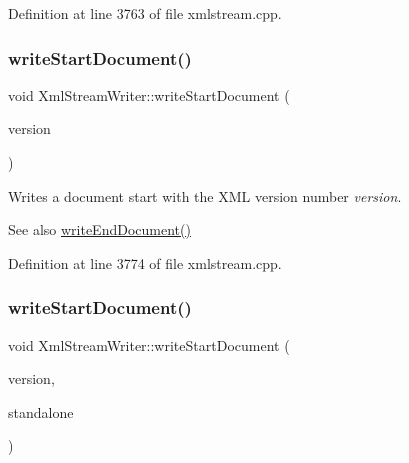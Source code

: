 Definition at line 3763 of file xmlstream.\+cpp.

\mbox{\label{class_xml_stream_writer_affda139fb2d91c8893615b6ca6b9570a}} 
\subsubsection{\texorpdfstring{write\+Start\+Document()}{writeStartDocument()}\hspace{0.1cm}{\footnotesize\ttfamily [2/3]}}
{\footnotesize\ttfamily void Xml\+Stream\+Writer\+::write\+Start\+Document (\begin{DoxyParamCaption}\item[{const Q\+String \&}]{version }\end{DoxyParamCaption})}

Writes a document start with the X\+ML version number {\itshape version}.

\begin{DoxySeeAlso}{See also}
\hyperlink{class_xml_stream_writer_a4fa078ed52892cec544e890efb1c3b50}{write\+End\+Document()} 
\end{DoxySeeAlso}


Definition at line 3774 of file xmlstream.\+cpp.

\mbox{\label{class_xml_stream_writer_af7df556ca625050ceba8041b9e71654b}} 
\subsubsection{\texorpdfstring{write\+Start\+Document()}{writeStartDocument()}\hspace{0.1cm}{\footnotesize\ttfamily [3/3]}}
{\footnotesize\ttfamily void Xml\+Stream\+Writer\+::write\+Start\+Document (\begin{DoxyParamCaption}\item[{const Q\+String \&}]{version,  }\item[{bool}]{standalone }\end{DoxyParamCaption})}

